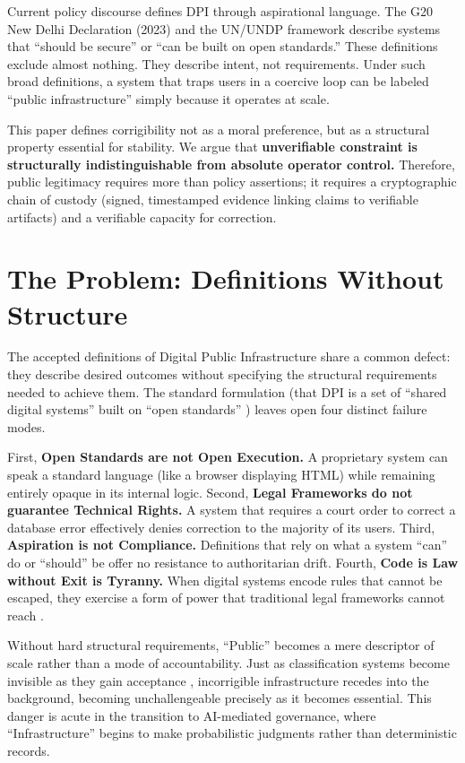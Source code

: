 \documentclass{article}
\begin{document}
Current policy discourse defines DPI through aspirational language. The G20 New Delhi Declaration (2023) and the UN/UNDP framework \citep{undp} describe systems that ``should be secure'' or ``can be built on open standards.'' These definitions exclude almost nothing. They describe intent, not requirements. Under such broad definitions, a system that traps users in a coercive loop can be labeled ``public infrastructure'' simply because it operates at scale.

This paper defines corrigibility not as a moral preference, but as a structural property essential for stability. We argue that \textbf{unverifiable constraint is structurally indistinguishable from absolute operator control.} Therefore, public legitimacy requires more than policy assertions; it requires a cryptographic chain of custody (signed, timestamped evidence linking claims to verifiable artifacts) and a verifiable capacity for correction.

\section{The Problem: Definitions Without Structure}

The accepted definitions of Digital Public Infrastructure share a common defect: they describe desired outcomes without specifying the structural requirements needed to achieve them. The standard formulation (that DPI is a set of ``shared digital systems'' built on ``open standards'' \citep{g20}) leaves open four distinct failure modes.

First, \textbf{Open Standards are not Open Execution.} A proprietary system can speak a standard language (like a browser displaying HTML) while remaining entirely opaque in its internal logic.
Second, \textbf{Legal Frameworks do not guarantee Technical Rights.} A system that requires a court order to correct a database error effectively denies correction to the majority of its users.
Third, \textbf{Aspiration is not Compliance.} Definitions that rely on what a system ``can'' do or ``should'' be offer no resistance to authoritarian drift.
Fourth, \textbf{Code is Law without Exit is Tyranny.} When digital systems encode rules that cannot be escaped, they exercise a form of power that traditional legal frameworks cannot reach \citep{lessig2006}.

Without hard structural requirements, ``Public'' becomes a mere descriptor of scale rather than a mode of accountability. Just as classification systems become invisible as they gain acceptance \citep{bowker1999}, incorrigible infrastructure recedes into the background, becoming unchallengeable precisely as it becomes essential. This danger is acute in the transition to AI-mediated governance, where ``Infrastructure'' begins to make probabilistic judgments rather than deterministic records.
\end{document}
